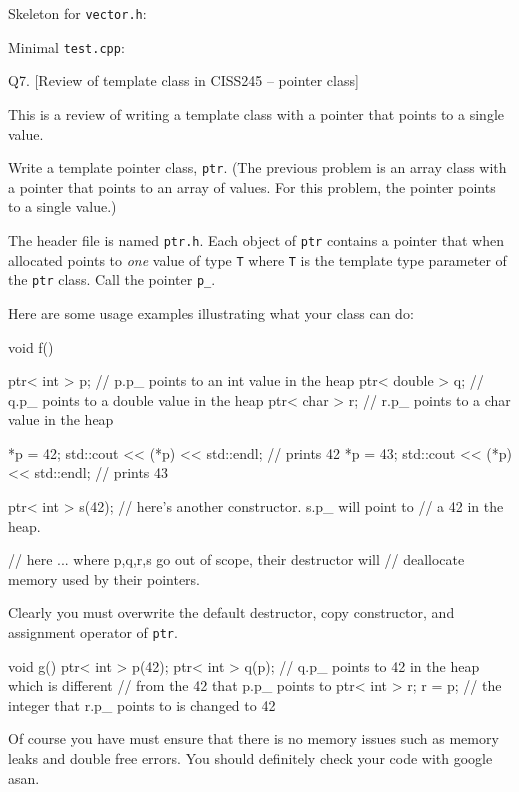 \newpage
Skeleton for \verb!vector.h!:
{\footnotesize
{}
}

\newpage
Minimal \verb!test.cpp!:
{\footnotesize
{}
}




\newpage
Q7. [Review of template class in CISS245 -- pointer class]

This is a review of writing a template class with a pointer that points
to a single value.

Write a template pointer class, \verb!ptr!.
(The previous problem is an array class with a pointer that points to an
array of values. For this problem, the pointer points to a single value.)

The header file is named \verb!ptr.h!.
Each object of \verb!ptr! contains a pointer that when allocated points to
\textit{one} value of type \verb!T! where \verb!T! is the template
type parameter of the \verb!ptr! class.
Call the pointer \verb!p_!.

Here are some usage examples illustrating what your class can do:
\begin{console}[fontsize=\footnotesize]
void f()
{
    ptr< int > p;    // p.p_ points to an int value in the heap
    ptr< double > q; // q.p_ points to a double value in the heap
    ptr< char > r;   // r.p_ points to a char value in the heap
  
    *p = 42;
    std::cout << (*p) << std::endl; // prints 42
    *p = 43;
    std::cout << (*p) << std::endl; // prints 43

    ptr< int > s(42); // here's another constructor. s.p_ will point to
                      // a 42 in the heap.
    
    // here ... where p,q,r,s go out of scope, their destructor will
    // deallocate memory used by their pointers.
}
\end{console}
Clearly you must overwrite the default destructor, copy constructor,
and assignment operator of \verb!ptr!.
\begin{console}[fontsize=\footnotesize]
void g()
{
    ptr< int > p(42); 
    ptr< int > q(p);  // q.p_ points to 42 in the heap which is different
                      // from the 42 that p.p_ points to
    ptr< int > r;
    r = p;            // the integer that r.p_ points to is changed to 42
}
\end{console}

Of course you have must ensure that there is no memory issues such as
memory leaks and double free errors.
You should definitely check your code with google asan.


